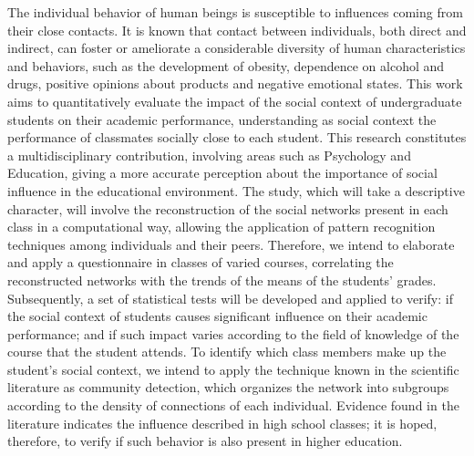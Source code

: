 \begin{Abstract}
The individual behavior of human beings is susceptible to influences coming from their close contacts. It is known that contact between individuals, both direct and indirect, can foster or ameliorate a considerable diversity of human characteristics and behaviors, such as the development of obesity, dependence on alcohol and drugs, positive opinions about products and negative emotional states. This work aims to quantitatively evaluate the impact of the social context of undergraduate students on their academic performance, understanding as social context the performance of classmates socially close to each student. This research constitutes a multidisciplinary contribution, involving areas such as Psychology and Education, giving a more accurate perception about the importance of social influence in the educational environment. The study, which will take a descriptive character, will involve the reconstruction of the social networks present in each class in a computational way, allowing the application of pattern recognition techniques among individuals and their peers. Therefore, we intend to elaborate and apply a questionnaire in classes of varied courses, correlating the reconstructed networks with the trends of the means of the students' grades. Subsequently, a set of statistical tests will be developed and applied to verify: if the social context of students causes significant influence on their academic performance; and if such impact varies according to the field of knowledge of the course that the student attends. To identify which class members make up the student's social context, we intend to apply the technique known in the scientific literature as community detection, which organizes the network into subgroups according to the density of connections of each individual. Evidence found in the literature indicates the influence described in high school classes; it is hoped, therefore, to verify if such behavior is also present in higher education.
\end{Abstract} 

